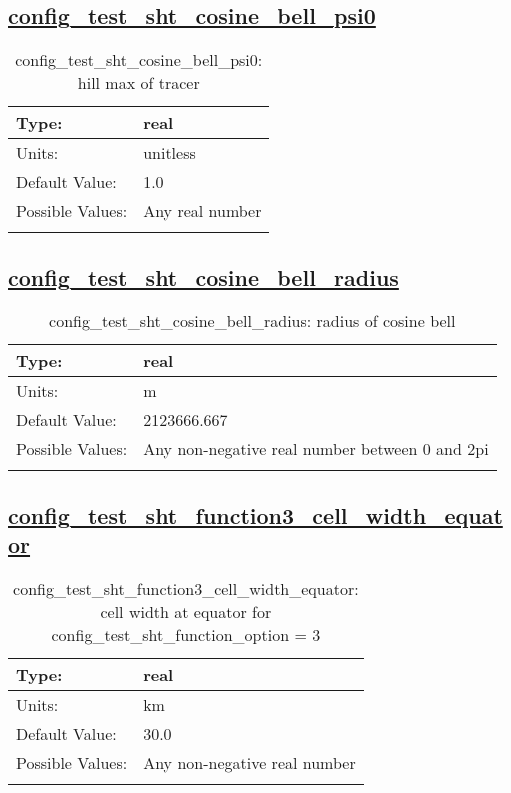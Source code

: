 \subsection[config\_test\_sht\_cosine\_bell\_psi0]{\hyperref[sec:nm_tab_test_sht]{config\_test\_sht\_cosine\_bell\_psi0}}
\label{subsec:nm_sec_config_test_sht_cosine_bell_psi0}
\begin{center}
\begin{longtable}{| p{2.0in} || p{4.0in} |}
    \hline
    Type: & real \\
    \hline
    Units: & \si{unitless} \\
    \hline
    Default Value: & 1.0 \\
    \hline
    Possible Values: & Any real number \\
    \hline
    \caption{config\_test\_sht\_cosine\_bell\_psi0: hill max of tracer}
\end{longtable}
\end{center}
\subsection[config\_test\_sht\_cosine\_bell\_radius]{\hyperref[sec:nm_tab_test_sht]{config\_test\_sht\_cosine\_bell\_radius}}
\label{subsec:nm_sec_config_test_sht_cosine_bell_radius}
\begin{center}
\begin{longtable}{| p{2.0in} || p{4.0in} |}
    \hline
    Type: & real \\
    \hline
    Units: & \si{m} \\
    \hline
    Default Value: & 2123666.667 \\
    \hline
    Possible Values: & Any non-negative real number between 0 and 2pi \\
    \hline
    \caption{config\_test\_sht\_cosine\_bell\_radius: radius of cosine bell}
\end{longtable}
\end{center}
\subsection[config\_test\_sht\_function3\_cell\_width\_equator]{\hyperref[sec:nm_tab_test_sht]{config\_test\_sht\_function3\_cell\_width\_equator}}
\label{subsec:nm_sec_config_test_sht_function3_cell_width_equator}
\begin{center}
\begin{longtable}{| p{2.0in} || p{4.0in} |}
    \hline
    Type: & real \\
    \hline
    Units: & \si{km} \\
    \hline
    Default Value: & 30.0 \\
    \hline
    Possible Values: & Any non-negative real number \\
    \hline
    \caption{config\_test\_sht\_function3\_cell\_width\_equator: cell width at equator for config\_test\_sht\_function\_option = 3}
\end{longtable}
\end{center}
